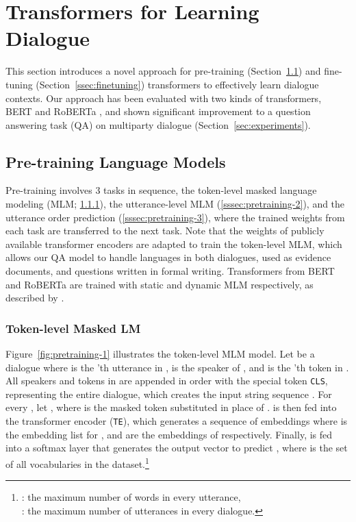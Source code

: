 \documentclass[11pt,a4paper]{article}
\newcommand{\textsec}[1]{\textsection\ref{#1}}
\begin{document}
\section{Transformers for Learning Dialogue}
\label{sec:approach}

This section introduces a novel approach for pre-training (Section~\ref{ssec:pretraining}) and fine-tuning (Section~\ref{ssec:finetuning}) transformers to effectively learn dialogue contexts.
Our approach has been evaluated with two kinds of transformers, BERT \cite{devlin_2019} and RoBERTa \cite{liu_2019}, and shown significant improvement to a question answering task (QA) on multiparty dialogue (Section~\ref{sec:experiments}).



\subsection{Pre-training Language Models}
\label{ssec:pretraining}

Pre-training involves 3 tasks in sequence, the token-level masked language modeling (MLM; \textsec{sssec:pretraining-1}), the utterance-level MLM (\textsec{sssec:pretraining-2}), and the utterance order prediction (\textsec{sssec:pretraining-3}), where the trained weights from each task are transferred to the next task.
Note that the weights of publicly available transformer encoders are adapted to train the token-level MLM, which allows our QA model to handle languages in both dialogues, used as evidence documents, and questions written in formal writing. 
Transformers from BERT and RoBERTa are trained with static and dynamic MLM respectively, as described by \citet{devlin_2019,liu_2019}.



\subsubsection{Token-level Masked LM}
\label{sssec:pretraining-1}

Figure~\ref{fig:pretraining-1} illustrates the token-level MLM model.
Let  be a dialogue where  is the 'th utterance in ,  is the speaker of , and  is the 'th token in .
All speakers and tokens in  are appended in order with the special token \texttt{CLS}, representing the entire dialogue, which creates the input string sequence .
For every , let , where  is the masked token substituted in place of .
 is then fed into the transformer encoder (\texttt{TE}), which generates a sequence of embeddings  where  is the embedding list for , and  are the embeddings of  respectively.
Finally,  is fed into a softmax layer that generates the output vector  to predict , where  is the set of all vocabularies in the dataset.\footnote{: the maximum number of words in every utterance,\\: the maximum number of utterances in every dialogue.}
\end{document}
